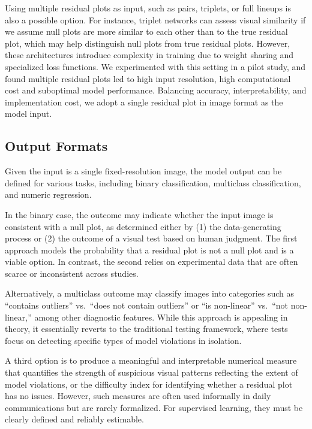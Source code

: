 \documentclass[]{interact}
\theoremstyle{plain}%
\theoremstyle{definition}
\theoremstyle{remark}
\begin{document}
Using multiple residual plots as input, such as pairs, triplets, or full
lineups is also a possible option. For instance, triplet networks
\citep{chopra2005learning} can assess visual similarity if we assume
null plots are more similar to each other than to the true residual
plot, which may help distinguish null plots from true residual plots.
However, these architectures introduce complexity in training due to
weight sharing and specialized loss functions. We experimented with this
setting in a pilot study, and found multiple residual plots led to high
input resolution, high computational cost and suboptimal model
performance. Balancing accuracy, interpretability, and implementation
cost, we adopt a single residual plot in image format as the model
input.

\subsection{Output Formats}\label{output-formats}

Given the input is a single fixed-resolution image, the model output can
be defined for various tasks, including binary classification,
multiclass classification, and numeric regression.

In the binary case, the outcome may indicate whether the input image is
consistent with a null plot, as determined either by (1) the
data-generating process or (2) the outcome of a visual test based on
human judgment. The first approach models the probability that a
residual plot is not a null plot and is a viable option. In contrast,
the second relies on experimental data that are often scarce or
inconsistent across studies.

Alternatively, a multiclass outcome may classify images into categories
such as ``contains outliers'' vs.~``does not contain outliers'' or ``is
non-linear'' vs.~``not non-linear,'' among other diagnostic features.
While this approach is appealing in theory, it essentially reverts to
the traditional testing framework, where tests focus on detecting
specific types of model violations in isolation.

A third option is to produce a meaningful and interpretable numerical
measure that quantifies the strength of suspicious visual patterns
reflecting the extent of model violations, or the difficulty index for
identifying whether a residual plot has no issues. However, such
measures are often used informally in daily communications but are
rarely formalized. For supervised learning, they must be clearly defined
and reliably estimable.
\end{document}

